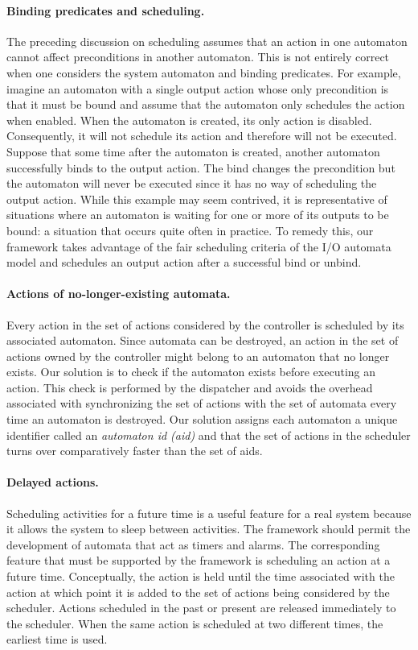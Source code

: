 \paragraph{Binding predicates and scheduling.}
The preceding discussion on scheduling assumes that an action in one automaton cannot affect preconditions in another automaton.
This is not entirely correct when one considers the system automaton and binding predicates.
For example, imagine an automaton with a single output action whose only precondition is that it must be bound and assume that the automaton only schedules the action when enabled.
When the automaton is created, its only action is disabled.
Consequently, it will not schedule its action and therefore will not be executed.
Suppose that some time after the automaton is created, another automaton successfully binds to the output action.
The bind changes the precondition but the automaton will never be executed since it has no way of scheduling the output action.
While this example may seem contrived, it is representative of situations where an automaton is waiting for one or more of its outputs to be bound: a situation that occurs quite often in practice.
To remedy this, our framework takes advantage of the fair scheduling criteria of the I/O automata model and schedules an output action after a successful bind or unbind.

\paragraph{Actions of no-longer-existing automata.}
Every action in the set of actions considered by the controller is scheduled by its associated automaton.
Since automata can be destroyed, an action in the set of actions owned by the controller might belong to an automaton that no longer exists.
Our solution is to check if the automaton exists before executing an action.
This check is performed by the dispatcher and avoids the overhead associated with synchronizing the set of actions with the set of automata every time an automaton is destroyed.
Our solution assigns each automaton a unique identifier called an \emph{automaton id (aid)} and that the set of actions in the scheduler turns over comparatively faster than the set of aids.

\paragraph{Delayed actions.}
Scheduling activities for a future time is a useful feature for a real system because it allows the system to sleep between activities.
The framework should permit the development of automata that act as timers and alarms.
The corresponding feature that must be supported by the framework is scheduling an action at a future time.
Conceptually, the action is held until the time associated with the action at which point it is added to the set of actions being considered by the scheduler.
Actions scheduled in the past or present are released immediately to the scheduler.
When the same action is scheduled at two different times, the earliest time is used.

